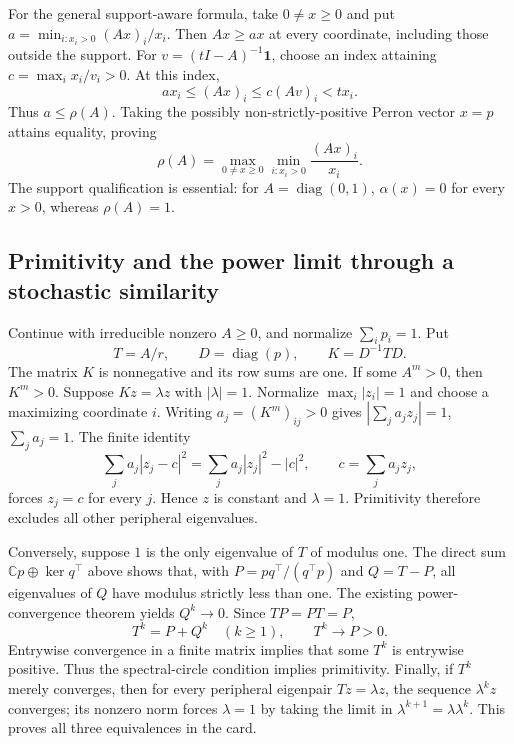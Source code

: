\documentclass[11pt,a4paper]{article}
\newcommand{\C}{\mathbb C}
\DeclareMathOperator{\diag}{diag}
\begin{document}
For the general support-aware formula, take $0\ne x\ge0$ and put
$a=\min_{i:x_i>0}(Ax)_i/x_i$. Then $Ax\ge ax$ at every coordinate,
including those outside the support. For $v=(tI-A)^{-1}\boldsymbol1$,
choose an index attaining $c=\max_i x_i/v_i>0$. At this index,
\[
 a x_i\le(Ax)_i\le c(Av)_i<t x_i.
\]
Thus $a\le\rho(A)$. Taking the possibly non-strictly-positive Perron
vector $x=p$ attains equality, proving
\[
 \rho(A)=\max_{0\ne x\ge0}\min_{i:x_i>0}\frac{(Ax)_i}{x_i}.
\]
The support qualification is essential: for $A=\diag(0,1)$,
$\alpha(x)=0$ for every $x>0$, whereas $\rho(A)=1$.

\subsection{Primitivity and the power limit through a stochastic similarity}

Continue with irreducible nonzero $A\ge0$, and normalize
$\sum_i p_i=1$. Put
\[
 T=A/r,\qquad D=\diag(p),\qquad K=D^{-1}TD.
\]
The matrix $K$ is nonnegative and its row sums are one. If some $A^m>0$,
then $K^m>0$. Suppose $Kz=\lambda z$ with $|\lambda|=1$. Normalize
$\max_i|z_i|=1$ and choose a maximizing coordinate $i$.
Writing $a_j=(K^m)_{ij}>0$ gives
$|\sum_j a_jz_j|=1$, $\sum_j a_j=1$. The finite identity
\[
 \sum_j a_j|z_j-c|^2=\sum_j a_j|z_j|^2-|c|^2,
 \qquad c=\sum_j a_jz_j,
\]
forces $z_j=c$ for every $j$. Hence $z$ is constant and $\lambda=1$.
Primitivity therefore excludes all other peripheral eigenvalues.

Conversely, suppose $1$ is the only eigenvalue of $T$ of modulus one.
The direct sum $\C p\oplus\ker q^\top$ above shows that, with
$P=pq^\top/(q^\top p)$ and $Q=T-P$, all eigenvalues of $Q$ have modulus
strictly less than one. The existing power-convergence theorem yields
$Q^k\to0$. Since $TP=PT=P$,
\[
 T^k=P+Q^k\quad(k\ge1),\qquad T^k\longrightarrow P>0.
\]
Entrywise convergence in a finite matrix implies that some $T^k$ is
entrywise positive. Thus the spectral-circle condition implies primitivity.
Finally, if $T^k$ merely converges, then for every peripheral eigenpair
$Tz=\lambda z$, the sequence $\lambda^kz$ converges; its nonzero norm
forces $\lambda=1$ by taking the limit in $\lambda^{k+1}=\lambda\lambda^k$.
This proves all three equivalences in the card.
\end{document}
